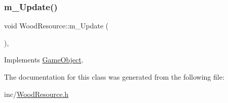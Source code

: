 \mbox{\label{class_wood_resource_a8ba1b597aacbdd74be37d0ab18d95008}} 
\subsubsection{\texorpdfstring{m\+\_\+\+Update()}{m\_Update()}}
{\footnotesize\ttfamily void Wood\+Resource\+::m\+\_\+\+Update (\begin{DoxyParamCaption}{ }\end{DoxyParamCaption})\hspace{0.3cm}{\ttfamily [override]}, {\ttfamily [virtual]}}



Implements \mbox{\hyperlink{class_game_object_a3af5a7b470e09f13a1422439fc6a9ba8}{Game\+Object}}.



The documentation for this class was generated from the following file\+:\begin{DoxyCompactItemize}
\item 
inc/\mbox{\hyperlink{_wood_resource_8h}{Wood\+Resource.\+h}}\end{DoxyCompactItemize}
